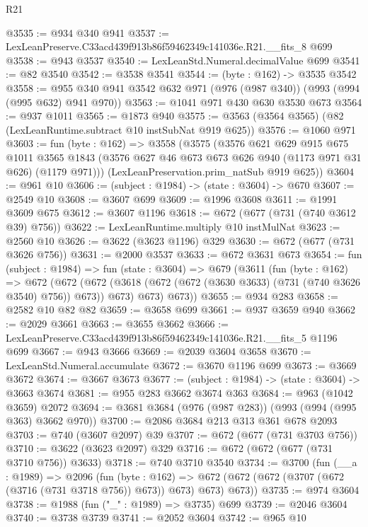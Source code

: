 \begin{lexlean}{R21}
\begin{coremodule}
@3535 := @934 @340 @941
@3537 := LexLeanPreserve.C33acd439f913b86f59462349c141036e.R21.__fits_8 @699
@3538 := @943 @3537
@3540 := LexLeanStd.Numeral.decimalValue @699
@3541 := @82 @3540
@3542 := @3538 @3541
@3544 := (byte : @162) -> @3535 @3542
@3558 := @955 @340 @941 @3542 @632 @971 (@976 (@987 @340)) (@993 (@994 (@995 @632) @941 @970))
@3563 := @1041 @971 @430 @630 @3530 @673
@3564 := @937 @1011
@3565 := @1873 @940
@3575 := @3563 (@3564 @3565) (@82 (LexLeanRuntime.subtract @10 instSubNat @919 @625))
@3576 := @1060 @971
@3603 := fun (byte : @162) =>
  @3558
    (@3575
      (@3576
        @621
        @629
        @915
        @675
        @1011
        @3565
        @1843
        (@3576 @627 @46 @673 @673 @626 @940 (@1173 @971 @31 @626) (@1179 @971)))
      (LexLeanPreservation.prim_natSub @919 @625))
@3604 := @961 @10
@3606 := (subject : @1984) -> (state : @3604) -> @670
@3607 := @2549 @10
@3608 := @3607 @699
@3609 := @1996 @3608
@3611 := @1991 @3609 @675
@3612 := @3607 @1196
@3618 := @672 (@677 (@731 (@740 @3612 @39) @756))
@3622 := LexLeanRuntime.multiply @10 instMulNat
@3623 := @2560 @10
@3626 := @3622 (@3623 @1196) @329
@3630 := @672 (@677 (@731 @3626 @756))
@3631 := @2000 @3537
@3633 := @672 @3631 @673
@3654 := fun (subject : @1984) =>
  fun (state : @3604) =>
  @679
    (@3611
      (fun (byte : @162) =>
      @672
        (@672
          (@672 (@3618 (@672 (@672 (@3630 @3633) (@731 (@740 @3626 @3540) @756)) @673)) @673)
          @673)
        @673))
@3655 := @934 @283
@3658 := @2582 @10 @82 @82
@3659 := @3658 @699
@3661 := @937 @3659 @940
@3662 := @2029 @3661
@3663 := @3655 @3662
@3666 := LexLeanPreserve.C33acd439f913b86f59462349c141036e.R21.__fits_5 @1196 @699
@3667 := @943 @3666
@3669 := @2039 @3604 @3658
@3670 := LexLeanStd.Numeral.accumulate
@3672 := @3670 @1196 @699
@3673 := @3669 @3672
@3674 := @3667 @3673
@3677 := (subject : @1984) -> (state : @3604) -> @3663 @3674
@3681 := @955 @283 @3662 @3674 @363
@3684 := @963 (@1042 @3659) @2072
@3694 := @3681 @3684 (@976 (@987 @283)) (@993 (@994 (@995 @363) @3662 @970))
@3700 := @2086 @3684 @213 @313 @361 @678 @2093
@3703 := @740 (@3607 @2097) @39
@3707 := @672 (@677 (@731 @3703 @756))
@3710 := @3622 (@3623 @2097) @329
@3716 := @672 (@672 (@677 (@731 @3710 @756)) @3633)
@3718 := @740 @3710 @3540
@3734 := @3700
    (fun (__a : @1989) =>
    @2096
      (fun (byte : @162) =>
      @672 (@672 (@672 (@3707 (@672 (@3716 (@731 @3718 @756)) @673)) @673) @673) @673))
@3735 := @974 @3604
@3738 := @1988 (fun ("_" : @1989) => @3735) @699
@3739 := @2046 @3604
@3740 := @3738 @3739
@3741 := @2052 @3604
@3742 := @965 @10

\end{coremodule}
\end{lexlean}
